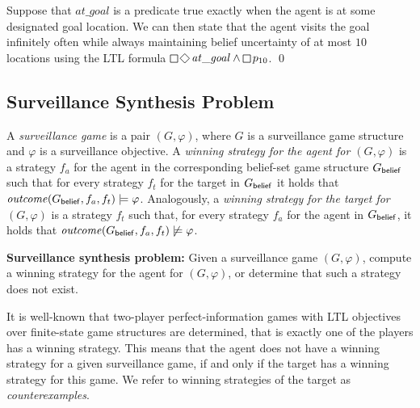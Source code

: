 \begin{example}
Suppose that $\mathit{at\_goal}$ is a predicate true exactly when the agent is at some designated goal location. We can then state that the agent visits the goal infinitely often while always maintaining belief uncertainty of at most $10$ locations using the LTL formula $\LTLglobally\LTLfinally \mathit{at\_goal} \wedge \LTLglobally p_{10}$.
\qed
\end{example}

\subsection{Surveillance Synthesis Problem}
A \emph{surveillance game} is a pair $(G,\varphi)$, where $G$ is a surveillance game structure and $\varphi$ is a surveillance objective. A \emph{winning strategy for the agent for $(G,\varphi)$} is a strategy $f_a$ for the agent in the corresponding belief-set game structure $G_{\mathsf{belief}}$ such that for every strategy $f_t$ for the target in $G_{\mathsf{belief}}$ it holds that $\mathit{outcome}(G_{\mathsf{belief}},f_a,f_t) \models \varphi$. Analogously, a \emph{winning strategy for the target for $(G,\varphi)$} is a strategy $f_t$ such that, for every strategy $f_a$ for the agent in $G_{\mathsf{belief}}$, it holds that $\mathit{outcome}(G_{\mathsf{belief}},f_a,f_t) \not\models \varphi$.

{\bf Surveillance synthesis problem:} Given a surveillance game $(G,\varphi)$, compute a winning strategy for the agent for $(G,\varphi)$, or determine that such a strategy does not exist.


It is well-known that two-player perfect-information games with LTL objectives over finite-state game structures are determined, that is exactly one of the players has a winning strategy. This means that the agent does not have a winning strategy for a given surveillance game, if and only if the target has a winning strategy for this game. We refer to winning strategies of the target as \emph{counterexamples}.